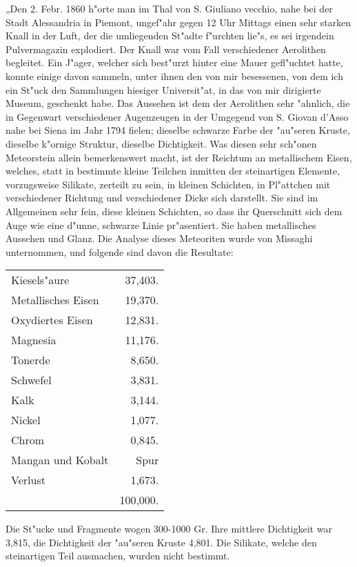 \documentclass[a4paper, 11pt, oneside]{article}
\begin{document}
„Den 2. Febr. 1860 h"orte man im Thal von S. Giuliano vecchio, nahe bei der Stadt Alessandria in Piemont, ungef"ahr gegen 12 Uhr Mittags einen sehr starken Knall in der Luft, der die umliegenden St"adte f"urchten lie"s, es sei irgendein Pulvermagazin explodiert. Der Knall war vom Fall verschiedener Aerolithen begleitet. Ein J"ager, welcher sich best"urzt hinter eine Mauer gefl"uchtet hatte, konnte einige davon sammeln, unter ihnen den von mir besessenen, von dem ich ein St"uck den Sammlungen hiesiger Universit"at, in das von mir dirigierte Museum, geschenkt habe. Das Aussehen ist dem der Aerolithen sehr "ahnlich, die in Gegenwart verschiedener Augenzeugen in der Umgegend von S. Giovan d'Asso nahe bei Siena im Jahr 1794 fielen; dieselbe schwarze Farbe der "au"seren Kruste, dieselbe k"ornige Struktur, dieselbe Dichtigkeit. Was diesen sehr sch"onen Meteorstein allein bemerkenswert macht, ist der Reichtum an metallischem Eisen, welches, statt in bestimmte kleine Teilchen inmitten der steinartigen Elemente, vorzugsweise Silikate, zerteilt zu sein, in kleinen Schichten, in Pl"attchen mit verschiedener Richtung und verschiedener Dicke sich darstellt. Sie sind im Allgemeinen sehr fein, diese kleinen Schichten, so dass ihr Querschnitt sich dem Auge wie eine d"unne, schwarze Linie pr"asentiert. Sie haben metallisches Aussehen und Glanz. Die Analyse dieses Meteoriten wurde von Missaghi unternommen, und folgende sind davon die Resultate:
\begin{table}[H]
    \centering
    \begin{tabular}{l r}
        Kiesels"aure & 37,403. \\
        Metallisches Eisen & 19,370. \\
        Oxydiertes Eisen & 12,831. \\
        Magnesia & 11,176. \\
        Tonerde & 8,650. \\
        Schwefel & 3,831. \\
        Kalk & 3,144. \\
        Nickel & 1,077. \\
        Chrom & 0,845. \\
        Mangan und Kobalt  & Spur \\
        Verlust & 1,673. \\
         & 100,000. \\
    \end{tabular}
\end{table}

Die St"ucke und Fragmente wogen 300-1000 Gr. Ihre mittlere Dichtigkeit war 3,815, die Dichtigkeit der "au"seren Kruste 4,801. Die Silikate, welche den steinartigen Teil ausmachen, wurden nicht bestimmt.
\end{document}
